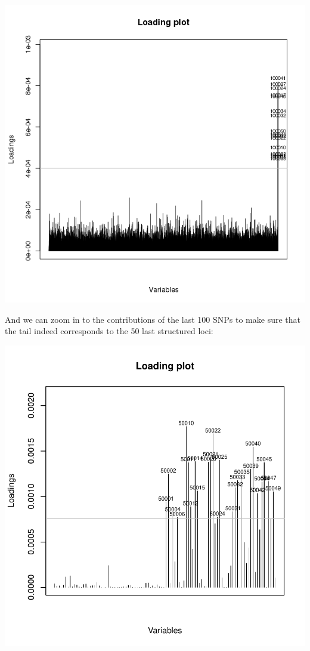 \documentclass{article}
\begin{document}
\begin{center}
  \includegraphics{figs/loadingplotGL}
\end{center}

\noindent And we can zoom in to the contributions of the last 100 SNPs to make sure that the tail indeed
corresponds to the 50 last structured loci:
\begin{Schunk}
\end{Schunk}
\includegraphics{figs/genomics-061}
\end{document}
